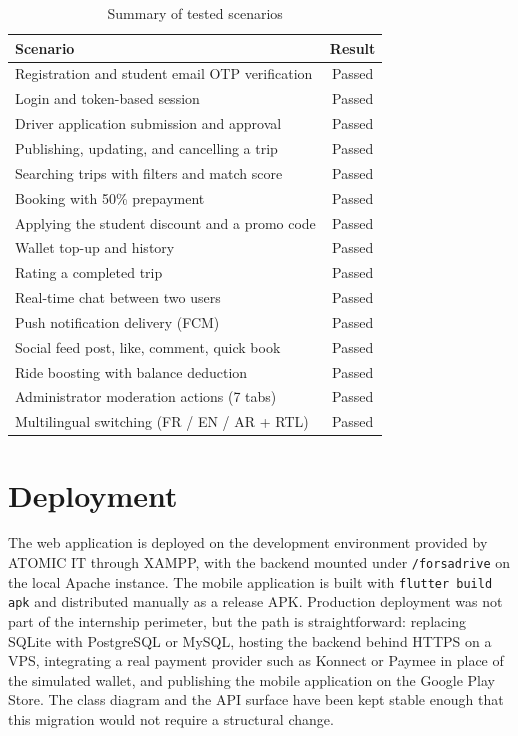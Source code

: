 \begin{table}[H]
\centering
\caption{Summary of tested scenarios}
\label{tab:tests_summary}
\begin{tabular}{|l|c|}
\hline
\textbf{Scenario}                             & \textbf{Result} \\
\hline
Registration and student email OTP verification & Passed \\
\hline
Login and token-based session                 & Passed \\
\hline
Driver application submission and approval    & Passed \\
\hline
Publishing, updating, and cancelling a trip   & Passed \\
\hline
Searching trips with filters and match score  & Passed \\
\hline
Booking with 50\% prepayment                  & Passed \\
\hline
Applying the student discount and a promo code & Passed \\
\hline
Wallet top-up and history                     & Passed \\
\hline
Rating a completed trip                       & Passed \\
\hline
Real-time chat between two users              & Passed \\
\hline
Push notification delivery (FCM)              & Passed \\
\hline
Social feed post, like, comment, quick book   & Passed \\
\hline
Ride boosting with balance deduction          & Passed \\
\hline
Administrator moderation actions (7 tabs)     & Passed \\
\hline
Multilingual switching (FR / EN / AR + RTL)   & Passed \\
\hline
\end{tabular}
\end{table}

\section{Deployment}

The web application is deployed on the development environment provided by ATOMIC IT through XAMPP, with the backend mounted under \texttt{/forsadrive} on the local Apache instance. The mobile application is built with \texttt{flutter build apk} and distributed manually as a release APK. Production deployment was not part of the internship perimeter, but the path is straightforward: replacing SQLite with PostgreSQL or MySQL, hosting the backend behind HTTPS on a VPS, integrating a real payment provider such as Konnect or Paymee in place of the simulated wallet, and publishing the mobile application on the Google Play Store. The class diagram and the API surface have been kept stable enough that this migration would not require a structural change.

